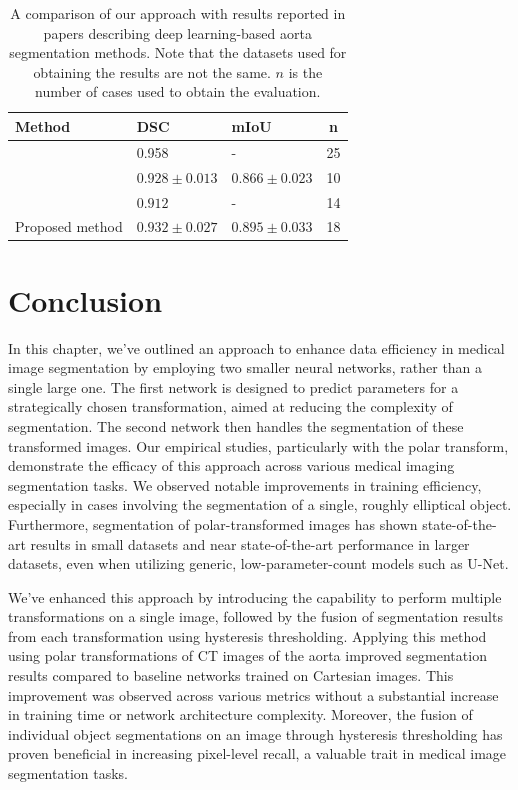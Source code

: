 \begin{table}[h]
\def\arraystretch{1.25}
\centering
\begin{tabularx}{\textwidth}{X l l c}
 \textbf{Method} & \textbf{DSC} & \textbf{mIoU} & \textbf{n}\\ 
 \hline
\citet{yuThreeDimensionalDeepConvolutional2021} & 0.958 & - & 25 \\
\citet{fantazzini3DAutomaticSegmentation2020} & $0.928 \pm 0.013$ & $0.866 \pm 0.023$ & 10 \\
\citet{cheungComputationallyEfficientApproach2021} & $0.912$ & - & 14 \\
Proposed method & $0.932 \pm 0.027$ & $0.895 \pm 0.033$ & 18 \\
\end{tabularx}
\caption{A comparison of our approach with results reported in papers describing deep learning-based aorta segmentation methods. Note that the datasets used for obtaining the results are not the same. $n$ is the number of cases used to obtain the evaluation.}
\label{table:comparison}
\end{table}


  \section{Conclusion}
    
In this chapter, we've outlined an approach to enhance data efficiency in medical image segmentation by employing two smaller neural networks, rather than a single large one. The first network is designed to predict parameters for a strategically chosen transformation, aimed at reducing the complexity of segmentation. The second network then handles the segmentation of these transformed images. Our empirical studies, particularly with the polar transform, demonstrate the efficacy of this approach across various medical imaging segmentation tasks. We observed notable improvements in training efficiency, especially in cases involving the segmentation of a single, roughly elliptical object. Furthermore, segmentation of polar-transformed images has shown state-of-the-art results in small datasets and near state-of-the-art performance in larger datasets, even when utilizing generic, low-parameter-count models such as U-Net.

We've enhanced this approach by introducing the capability to perform multiple transformations on a single image, followed by the fusion of segmentation results from each transformation using hysteresis thresholding. Applying this method using polar transformations of CT images of the aorta improved segmentation results compared to baseline networks trained on Cartesian images. This improvement was observed across various metrics without a substantial increase in training time or network architecture complexity. Moreover, the fusion of individual object segmentations on an image through hysteresis thresholding has proven beneficial in increasing pixel-level recall, a valuable trait in medical image segmentation tasks.


